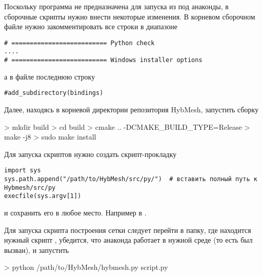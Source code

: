 Поскольку программа не предназначена для запуска из под анаконды,
в сборочные скрипты нужно внести некоторые изменения.
В корневом сборочном файле  
нужно закомментировать все строки в диапазоне
\begin{verbatim}
# ========================== Python check
....
# ========================== Windows installer options
\end{verbatim}
а в файле  последнюю строку
\begin{verbatim}
#add_subdirectory(bindings)
\end{verbatim}

Далее, находясь в корневой директории репозитория HybMesh, запустить сборку
\begin{shelloutput}
> mkdir build
> cd build
> cmake .. -DCMAKE_BUILD_TYPE=Release
> make -j8
> sudo make install
\end{shelloutput}

Для запуска скриптов нужно создать скрипт-прокладку
\begin{verbatim}
import sys
sys.path.append("/path/to/HybMesh/src/py/")  # вставить полный путь к Hybmesh/src/py
execfile(sys.argv[1])
\end{verbatim}
и сохранить его в любое место. Например в .

Для запуска скрипта построения сетки следует перейти в папку, где находится нужный скрипт ,
убедится, что анаконда работает в нужной среде (то есть  был вызван),
и запустить
\begin{shelloutput}
> python /path/to/HybMesh/hybmesh.py script.py
\end{shelloutput}
